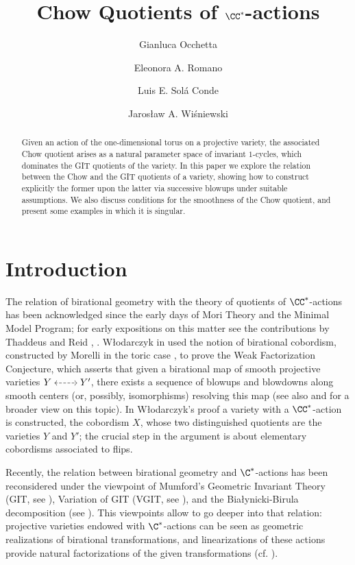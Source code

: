 \documentclass[reqno]{amsproc}
\title[Chow Quotients]{Chow Quotients of $\CC^*$-actions}
\author[Occhetta]{Gianluca Occhetta}
\author[Romano]{Eleonora A. Romano}
\author[Sol\'a Conde]{Luis E. Sol\'a Conde}
\author[Wi\'sniewski]{Jaros\l{}aw A. Wi\'sniewski}
\theoremstyle{definition}
\begin{document}
\begin{abstract}
Given an action of the one-dimensional torus on a projective variety, the associated Chow quotient arises as a natural parameter space of invariant $1$-cycles, which dominates the GIT quotients of the variety.  
In this paper we explore the relation between the Chow and the GIT quotients of a variety, showing how to construct explicitly the former upon the latter via successive blowups under suitable assumptions. We also discuss conditions for the smoothness of the Chow quotient, and present some examples in which it is singular.
\end{abstract}


\maketitle
\tableofcontents
\section{Introduction}\label{wors6:sec:intro}

The relation of birational geometry with the theory of quotients of $\CC^*$-actions has been acknowledged since the early days of  Mori Theory and the Minimal Model Program; for early expositions on this matter see the contributions by Thaddeus and Reid \cite{wors6-Thaddeus1996}, \cite{wors6-ReidFlip}. W{\l}odarczyk in  \cite{wors6-Wlodarczyk} used the notion of birational cobordism, constructed by Morelli in the toric case \cite{wors6-Morelli}, to prove the Weak Factorization Conjecture,  
which asserts that given a birational map of smooth projective varieties $\begin{tikzcd}[cramped]Y\ar[r,<->, dashed]&Y'\end{tikzcd}$, there exists a sequence of blowups and blowdowns along smooth centers (or, possibly, isomorphisms) resolving this map  (see also \cite{wors6-AKMW} and \cite{wors6-Wlodarczyk2009} for a broader view on this topic). In W{\l}odarczyk's proof a variety with a $\CC^*$-action is constructed, the cobordism $X$, whose two distinguished quotients are the varieties $Y$ and $Y'$; the crucial step in the argument is about elementary cobordisms associated to flips. 

Recently, the relation between birational geometry and $\C^*$-actions has been reconsidered under the viewpoint of Mumford's Geometric Invariant Theory (GIT, see \cite{wors6-MFK}), Variation of GIT (VGIT, see \cite{wors6-DolgachevHu}), and the Bia{\l}ynicki-Birula decomposition (see \cite{wors6-BB,wors6-BBS}). This viewpoints allow to go deeper into that relation: projective varieties endowed with $\C^*$-actions can be seen as geometric realizations of birational transformations, and linearizations of these actions provide natural factorizations of the given transformations (cf. \cite{wors6-WORS4,wors6-WORS5,wors6-WORS3,wors6-WORS1,wors6-BRUS}). 
\end{document}
